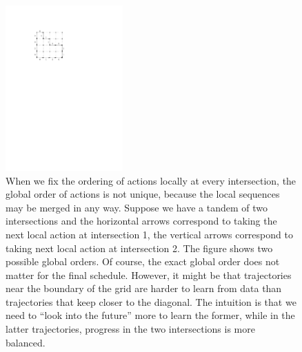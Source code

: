 \documentclass[a4paper]{article}
\theoremstyle{definition}
\theoremstyle{plain}
\begin{document}
\begin{figure}
  \centering
  \includegraphics[width=0.4\textwidth]{figures/network/solution_equivalence}
  \caption{When we fix the ordering of actions locally at every intersection,
    the global order of actions is not unique, because the local sequences may
    be merged in any way. Suppose we have a tandem of two intersections and the
    horizontal arrows correspond to taking the next local action at intersection
    1, the vertical arrows correspond to taking next local action at
    intersection 2. The figure shows two possible global orders. Of course, the
    exact global order does not matter for the final schedule. However, it might
    be that trajectories near the boundary of the grid are harder to learn from
    data than trajectories that keep closer to the diagonal. The intuition is
    that we need to ``look into the future'' more to learn the former, while in
    the latter trajectories, progress in the two intersections is more balanced.}
  \label{fig:solution_equivalence}
\end{figure}
\end{document}
